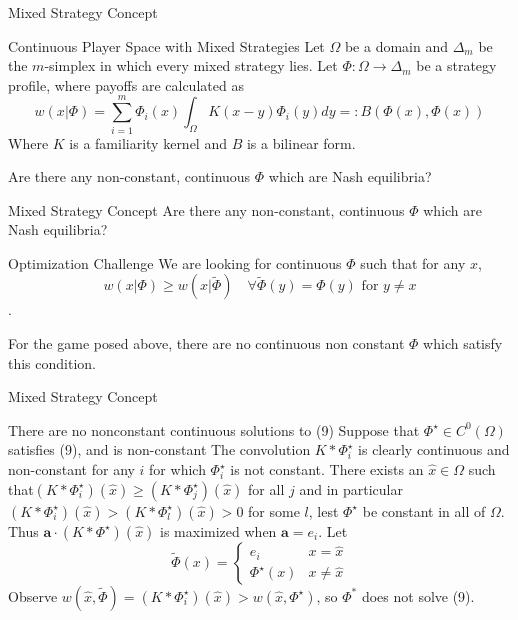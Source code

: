 \documentclass{beamer}
\begin{document}
\begin{frame}{Mixed Strategy Concept}
	\begin{block}{Continuous Player Space with Mixed Strategies}
		Let $\Omega$ be a domain and $\Delta_m$ be the $m$-simplex in which every mixed strategy lies. Let $\Phi:\Omega \rightarrow\Delta_m$ be a strategy profile, where payoffs are calculated as 
		\begin{equation}
			w(x|\Phi)=\sum_{i=1}^m \Phi_i(x)\int_\Omega K(x-y)\Phi_i(y)dy =:B(\Phi(x),\Phi(x)) 
		\end{equation} 
		Where $K$ is a familiarity kernel and $B$ is a bilinear form. 
	\end{block}
	Are there any non-constant, continuous $\Phi$ which are Nash equilibria? 
\end{frame}

\begin{frame}{Mixed Strategy Concept}
	Are there any non-constant, continuous $\Phi$ which are Nash equilibria?
	\begin{block}{Optimization Challenge}
		We are looking for continuous $\Phi$ such that for any $x$,
		\begin{equation}
			w(x|\Phi)\geq w(x|\tilde\Phi)\quad \forall \tilde \Phi(y) = \Phi (y) \text{ for } y\neq x
		\end{equation}. 
	\end{block}

	For the game posed above, there are no continuous non constant $\Phi$ which satisfy this condition. 
\end{frame}

\begin{frame}{Mixed Strategy Concept}
	\begin{block}{There are no nonconstant continuous solutions to (9)}
		Suppose that $\Phi^\star\in C^0(\Omega)$ satisfies (9), and is non-constant 
		The convolution $K*\Phi^\star_i$ is clearly continuous and  non-constant for any $i$ for which $\Phi^\star_i$ is not constant.  There exists an $\hat x\in \Omega$ such that$(K*\Phi^\star_i)(\hat x)\geq(K*\Phi^\star_j)(\hat x)$ for all $j$ and in particular $(K*\Phi^\star_i)(\hat x)>(K*\Phi^\star_l)(\hat x)>0$ for some $l$, lest $\Phi^\star$ be constant in all of $\Omega$. Thus $\mathbf{a}\cdot (K*\Phi^\star)(\hat x)$ is maximized when $\mathbf{a}=e_i$. Let  \begin{equation}\tilde{\Phi}(x)=\begin{cases} e_i&x=\hat x\\
				\Phi^\star(x)&x\neq \hat x \end{cases}
		\end{equation}
	Observe  $w(\hat x, \tilde{\Phi})=(K*\Phi_i^\star)(\hat x)>w(\hat x, \Phi^\star)$, so $\Phi^*$ does not solve (9).
	\end{block}
\end{frame}
	
\end{document}
